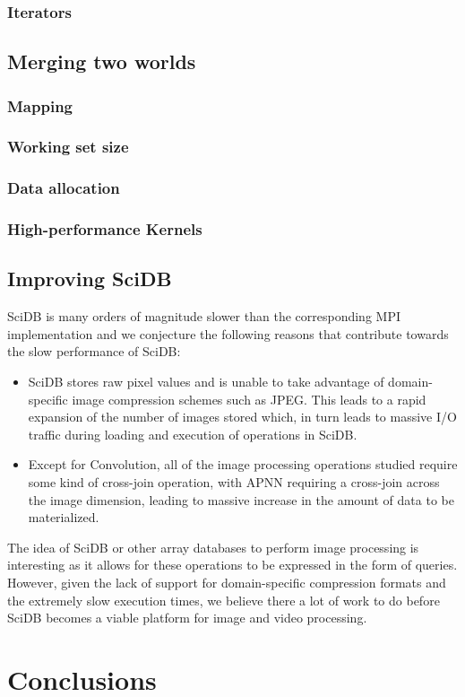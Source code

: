 \documentclass[tog]{acmsiggraph}
\begin{document}
\subsubsection{Iterators}

\subsection{Merging two worlds}

\subsubsection{Mapping}

\subsubsection{Working set size}

\subsubsection{Data allocation}

\subsubsection{High-performance Kernels}

\subsection{Improving SciDB}
SciDB is many orders of magnitude slower than the corresponding MPI
implementation and we conjecture the following reasons that contribute towards
the slow performance of SciDB:

\begin{itemize}
\item SciDB stores raw pixel values and is unable to take advantage of
domain-specific image compression schemes such as JPEG. This leads to a rapid
expansion of the number of images stored which, in turn leads to massive I/O
traffic during loading and execution of operations in SciDB.
\item Except for Convolution, all of the image processing operations studied
require some kind of cross-join operation, with APNN requiring a cross-join
across the image dimension, leading to massive increase in the amount of data
to be materialized.
\end{itemize}

The idea of SciDB or other array databases to perform image processing is
interesting as it allows for these operations to be expressed in the form of
queries. However, given the lack of support for domain-specific compression
formats and the extremely slow execution times, we believe there a lot of work
to do before SciDB becomes a viable platform for image and video processing.

\section{Conclusions}


\nocite{*}

\end{document}
